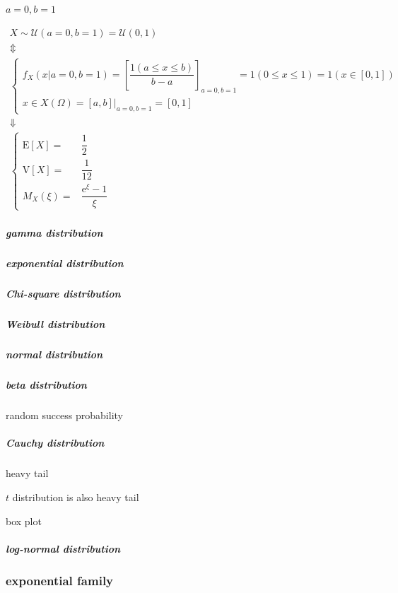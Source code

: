 \documentclass[
]{book}
\theoremstyle{definition}
\theoremstyle{definition}
\theoremstyle{definition}
\theoremstyle{definition}
\theoremstyle{remark}
\begin{document}
\(a=0,b=1\)

\[
\begin{array}{c}
X\sim\mathcal{U}\left(a=0,b=1\right)=\mathcal{U}\left(0,1\right)\\
\Updownarrow\\
\begin{cases}
f_{{\scriptscriptstyle X}}\left(x|a=0,b=1\right)=\left[\dfrac{1\left(a\le x\le b\right)}{b-a}\right]_{{\scriptscriptstyle a=0,b=1}}=1\left(0\le x\le1\right)=1\left(x\in\left[0,1\right]\right)\\
x\in X\left(\Omega\right)=\left[a,b\right]|_{{\scriptscriptstyle a=0,b=1}}=\left[0,1\right]
\end{cases}\\
\Downarrow\\
\begin{cases}
\mathrm{E}\left[X\right]= & \dfrac{1}{2}\\
\mathrm{V}\left[X\right]= & \dfrac{1}{12}\\
M_{{\scriptscriptstyle X}}\left(\xi\right)= & \dfrac{\mathrm{e}^{\xi}-1}{\xi}
\end{cases}
\end{array}
\]

\subparagraph{gamma distribution}\label{gamma-distribution}

\subparagraph{exponential distribution}\label{exponential-distribution}

\subparagraph{Chi-square distribution}\label{chi-square-distribution}

\subparagraph{Weibull distribution}\label{weibull-distribution}

\subparagraph{normal distribution}\label{normal-distribution}

\subparagraph{beta distribution}\label{beta-distribution}

random success probability

\subparagraph{Cauchy distribution}\label{cauchy-distribution}

heavy tail

\(t\) distribution is also heavy tail

box plot

\subparagraph{log-normal distribution}\label{log-normal-distribution}

\subsubsection{exponential family}\label{exponential-family}
\end{document}
